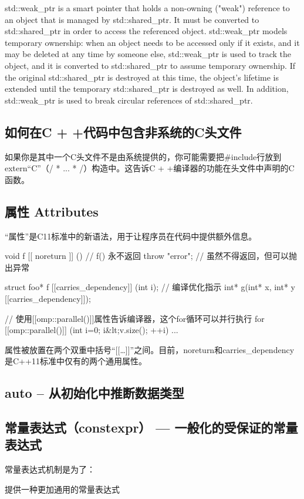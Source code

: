 std::weak_ptr is a smart pointer that holds a non-owning ("weak") reference to an object that is managed by std::shared_ptr. It must be converted to std::shared_ptr in order to 
access the referenced object.
std::weak_ptr models temporary ownership: when an object needs to be accessed only if it exists, and it may be deleted at any time by someone else, std::weak_ptr is used to track 
the object, and it is converted to std::shared_ptr to assume temporary ownership. If the original std::shared_ptr is destroyed at this time, the object's lifetime is extended 
until the temporary std::shared_ptr is destroyed as well.
In addition, std::weak_ptr is used to break circular references of std::shared_ptr.


\subsection{如何在C + +代码中包含非系统的C头文件}
如果你是其中一个C头文件不是由系统提供的，你可能需要把\#include行放到extern“C”（/ * ... * /）构造中。这告诉C + +编译器的功能在头文件中声明的C函数。
\subsection{属性 Attributes}
“属性”是C11标准中的新语法，用于让程序员在代码中提供额外信息。
\begin{Code}
	void f [[ noreturn ]] () // f() 永不返回
	{
		throw "error"; // 虽然不得返回，但可以抛出异常
	}
		
	struct foo* f [[carries_dependency]] (int i); // 编译优化指示
	int* g(int* x, int* y [[carries_dependency]]);
	
	// 使用[[omp::parallel()]]属性告诉编译器，这个for循环可以并行执行
	for [[omp::parallel()]] (int i=0; i&lt;v.size(); ++i) { ... }	
\end{Code}

属性被放置在两个双重中括号“[[…]]”之间。目前，noreturn和carries_dependency是C++11标准中仅有的两个通用属性。

\subsection{auto – 从初始化中推断数据类型}
\subsection{常量表达式（constexpr） — 一般化的受保证的常量表达式}
常量表达式机制是为了：

提供一种更加通用的常量表达式

